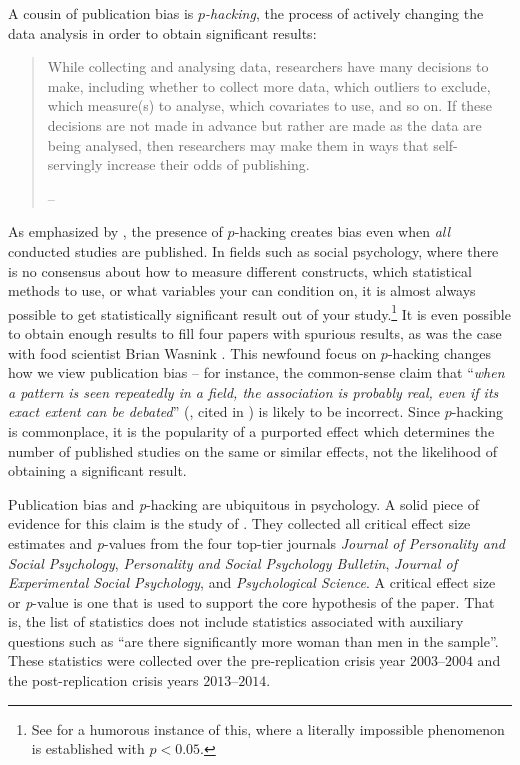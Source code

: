 A cousin of publication bias is \emph{$p$-hacking}, the process of actively changing the data analysis in order to obtain significant results:
\begin{quote}
While collecting and analysing data, researchers have many decisions to make, including whether to collect more data, which outliers to exclude, which measure(s) to analyse, which covariates to use, and so on. If these decisions are not made in advance but rather are made as the data are being analysed, then researchers may make them in ways that self-servingly increase their odds of publishing. 
\begin{flushright}
-- \textcite[p. 1]{simonsohn_p-curve:_2014}
\par\end{flushright}
\end{quote}
As emphasized by \textcite{simonsohn_p-curve:_2014}, the presence of $p$-hacking creates bias even when \emph{all} conducted studies are published. In fields such as social psychology, where there is no consensus about how to measure different constructs, which statistical methods to use, or what variables your can condition on, it is almost always possible to get statistically significant result out of your study.\footnote{See \textcite[p. 2, study 2]{simmons_false-positive_2011} for a humorous instance of this, where a literally impossible phenomenon is established with $p<0.05$.} It is even possible to obtain enough results to fill four papers with spurious results, as was the case with food scientist Brian Wasnink \parencite{van_der_zee_statistical_2017}. This newfound focus on $p$-hacking changes how we view publication bias -- for instance, the common-sense claim that ``\emph{when a pattern is seen repeatedly in a field, the association is probably real, even if its exact extent can be debated}\textquotedblright{} (\textcite{ioannidis_why_2008}, cited in \textcite{simonsohn_p-curve:_2014}) is likely to be incorrect. Since $p$-hacking is commonplace, it is the popularity of a purported effect which determines the number of published studies on the same or similar effects, not the likelihood of obtaining a significant result.

Publication bias and \emph{p}-hacking are ubiquitous in psychology. A solid piece of evidence for this claim is the study of \textcite{Motyl2017-dx}. They collected all critical effect size estimates and \emph{p}-values from the four top-tier journals \emph{Journal of Personality and Social Psychology}, \emph{Personality and Social Psychology Bulletin}, \emph{Journal of Experimental Social Psychology}, and \emph{Psychological Science}. A critical effect size or \emph{p}-value is one that is used to support the core hypothesis of the paper. That is, the list of statistics does not include statistics associated with auxiliary questions such as ``are there significantly more woman than men in the sample''. These statistics were collected over the pre-replication crisis year
$2003$--$2004$ and the post-replication crisis years $2013$--$2014$. 


